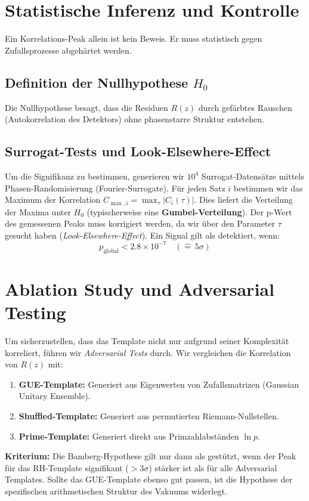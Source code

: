 \documentclass[11pt, a4paper]{article}
\begin{document}
	\section{Statistische Inferenz und Kontrolle}
	
	Ein Korrelations-Peak allein ist kein Beweis. Er muss statistisch gegen Zufallsprozesse abgehärtet werden.
	
	\subsection{Definition der Nullhypothese $H_0$}
	Die Nullhypothese besagt, dass die Residuen $R(z)$ durch gefärbtes Rauschen (Autokorrelation des Detektors) ohne phasenstarre Struktur entstehen.
	
	\subsection{Surrogat-Tests und Look-Elsewhere-Effect}
	Um die Signifikanz zu bestimmen, generieren wir $10^4$ Surrogat-Datensätze mittels Phasen-Randomisierung (Fourier-Surrogate).
	Für jeden Satz $i$ bestimmen wir das Maximum der Korrelation $C_{\max, i} = \max_\tau |C_i(\tau)|$.
	Dies liefert die Verteilung der Maxima unter $H_0$ (typischerweise eine \textbf{Gumbel-Verteilung}).
	Der p-Wert des gemessenen Peaks muss korrigiert werden, da wir über den Parameter $\tau$ gesucht haben (\textit{Look-Elsewhere-Effect}).
	Ein Signal gilt als detektiert, wenn:
	\begin{equation}
		p_{\text{global}} < 2.8 \times 10^{-7} \quad (\widehat{=} \, 5\sigma)
	\end{equation}
	
	\section{Ablation Study und Adversarial Testing}
	
	Um sicherzustellen, dass das Template nicht nur aufgrund seiner Komplexität korreliert, führen wir \textit{Adversarial Tests} durch. Wir vergleichen die Korrelation von $R(z)$ mit:
	\begin{enumerate}
		\item \textbf{GUE-Template:} Generiert aus Eigenwerten von Zufallsmatrizen (Gaussian Unitary Ensemble).
		\item \textbf{Shuffled-Template:} Generiert aus permutierten Riemann-Nullstellen.
		\item \textbf{Prime-Template:} Generiert direkt aus Primzahlabständen $\ln p$.
	\end{enumerate}
	\textbf{Kriterium:} Die Bamberg-Hypothese gilt nur dann als gestützt, wenn der Peak für das RH-Template signifikant ($>3\sigma$) stärker ist als für alle Adversarial Templates. Sollte das GUE-Template ebenso gut passen, ist die Hypothese der spezifischen arithmetischen Struktur des Vakuums widerlegt.
	
\end{document}
